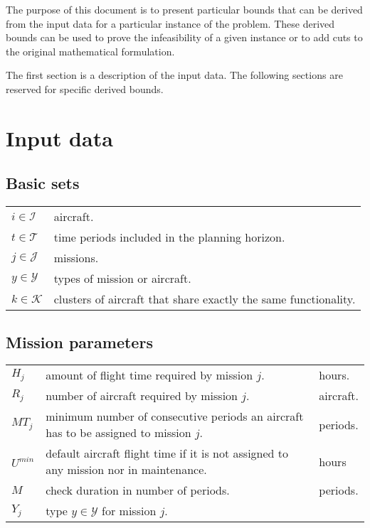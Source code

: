 \documentclass[a4paper,onecolumn,fleqn]{article}
\begin{document}
The purpose of this document is to present particular bounds that can be derived from the input data for a particular instance of the problem. These derived bounds can be used to prove the infeasibility of a given instance or to add cuts to the original mathematical formulation.

The first section is a description of the input data. The following sections are reserved for specific derived bounds.

\section{Input data}
    \subsection{Basic sets}

        \begin{tabular}{p{15mm}p{140mm}}
            $i \in \mathcal{I}$     &  aircraft. \\
            $t \in \mathcal{T}$     &  time periods included in the planning horizon. \\
            $j \in \mathcal{J}$     &  missions. \\
            $y \in \mathcal{Y}$     &  types of mission or aircraft. \\
            $k \in \mathcal{K}$     &  clusters of aircraft that share exactly the same functionality. \\
        \end{tabular}

    \subsection{Mission parameters}

        \begin{tabular}{p{15mm}p{125mm}p{15mm}}
            $H_j$             & amount of flight time required by mission $j$. & hours. \\
            $R_j$             & number of aircraft required by mission $j$. & aircraft. \\
            $MT_j$            & minimum number of consecutive periods an aircraft has to be assigned to mission $j$. & periods. \\
            $U^{min}$         & default aircraft flight time if it is not assigned to any mission nor in maintenance.& hours \\
            $M$               & check duration in number of periods. & periods. \\
            $Y_j$             & type $y \in \mathcal{Y}$ for mission $j$. \\
        \end{tabular}
\end{document}
